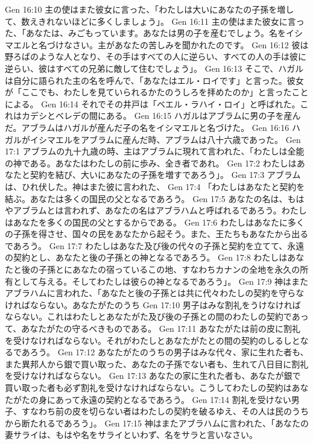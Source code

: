 Gen 16:10  主の使はまた彼女に言った、「わたしは大いにあなたの子孫を増して、数えきれないほどに多くしましょう」。
Gen 16:11  主の使はまた彼女に言った、「あなたは、みごもっています。あなたは男の子を産むでしょう。名をイシマエルと名づけなさい。主があなたの苦しみを聞かれたのです。
Gen 16:12  彼は野ろばのような人となり、その手はすべての人に逆らい、すべての人の手は彼に逆らい、彼はすべての兄弟に敵して住むでしょう」。
Gen 16:13  そこで、ハガルは自分に語られた主の名を呼んで、「あなたはエル・ロイです」と言った。彼女が「ここでも、わたしを見ていられるかたのうしろを拝めたのか」と言ったことによる。
Gen 16:14  それでその井戸は「ベエル・ラハイ・ロイ」と呼ばれた。これはカデシとベレデの間にある。
Gen 16:15  ハガルはアブラムに男の子を産んだ。アブラムはハガルが産んだ子の名をイシマエルと名づけた。
Gen 16:16  ハガルがイシマエルをアブラムに産んだ時、アブラムは八十六歳であった。
Gen 17:1  アブラムの九十九歳の時、主はアブラムに現れて言われた、「わたしは全能の神である。あなたはわたしの前に歩み、全き者であれ。
Gen 17:2  わたしはあなたと契約を結び、大いにあなたの子孫を増すであろう」。
Gen 17:3  アブラムは、ひれ伏した。神はまた彼に言われた、
Gen 17:4  「わたしはあなたと契約を結ぶ。あなたは多くの国民の父となるであろう。
Gen 17:5  あなたの名は、もはやアブラムとは言われず、あなたの名はアブラハムと呼ばれるであろう。わたしはあなたを多くの国民の父とするからである。
Gen 17:6  わたしはあなたに多くの子孫を得させ、国々の民をあなたから起そう。また、王たちもあなたから出るであろう。
Gen 17:7  わたしはあなた及び後の代々の子孫と契約を立てて、永遠の契約とし、あなたと後の子孫との神となるであろう。
Gen 17:8  わたしはあなたと後の子孫とにあなたの宿っているこの地、すなわちカナンの全地を永久の所有として与える。そしてわたしは彼らの神となるであろう」。
Gen 17:9  神はまたアブラハムに言われた、「あなたと後の子孫とは共に代々わたしの契約を守らなければならない。あなたがたのうち
Gen 17:10  男子はみな割礼をうけなければならない。これはわたしとあなたがた及び後の子孫との間のわたしの契約であって、あなたがたの守るべきものである。
Gen 17:11  あなたがたは前の皮に割礼を受けなければならない。それがわたしとあなたがたとの間の契約のしるしとなるであろう。
Gen 17:12  あなたがたのうちの男子はみな代々、家に生れた者も、また異邦人から銀で買い取った、あなたの子孫でない者も、生れて八日目に割礼を受けなければならない。
Gen 17:13  あなたの家に生れた者も、あなたが銀で買い取った者も必ず割礼を受けなければならない。こうしてわたしの契約はあなたがたの身にあって永遠の契約となるであろう。
Gen 17:14  割礼を受けない男子、すなわち前の皮を切らない者はわたしの契約を破るゆえ、その人は民のうちから断たれるであろう」。
Gen 17:15  神はまたアブラハムに言われた、「あなたの妻サライは、もはや名をサライといわず、名をサラと言いなさい。
